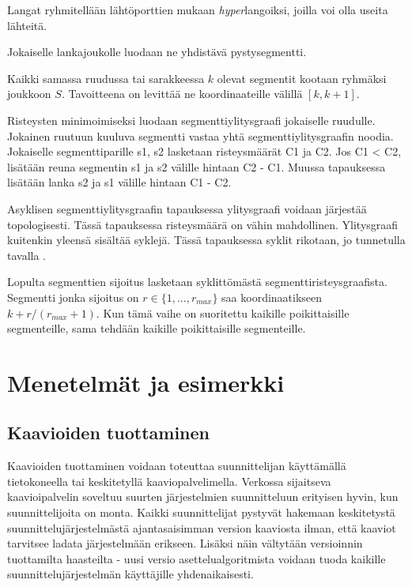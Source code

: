 \documentclass[finnish,12pt]{article}
\begin{document}
Langat ryhmitellään lähtöporttien mukaan \emph{hyper}langoiksi, joilla voi olla useita lähteitä.

Jokaiselle lankajoukolle luodaan ne yhdistävä pystysegmentti.

Kaikki samassa ruudussa tai sarakkeessa $k$ olevat segmentit kootaan ryhmäksi joukkoon $S$.
Tavoitteena on levittää ne koordinaateille välillä $[k, k+1]$.

Risteysten minimoimiseksi luodaan segmenttiylitysgraafi jokaiselle ruudulle.
Jokainen ruutuun kuuluva segmentti vastaa yhtä segmenttiylitysgraafin noodia.
Jokaiselle segmenttiparille s1, s2 lasketaan risteysmäärät C1 ja C2. Jos C1 < C2, lisätään reuna segmentin s1 ja s2 välille hintaan C2 - C1. Muussa tapauksessa lisätään lanka s2 ja s1 välille hintaan C1 - C2.

Asyklisen segmenttiylitysgraafin tapauksessa ylitysgraafi voidaan järjestää topologisesti.
Tässä tapauksessa risteysmäärä on vähin mahdollinen.
Ylitysgraafi kuitenkin yleensä sisältää syklejä. Tässä tapauksessa syklit rikotaan, jo tunnetulla tavalla \cite{RefWorks:48}.

Lopulta segmenttien sijoitus lasketaan syklittömästä segmenttiristeysgraafista.
Segmentti jonka sijoitus on $r \in \{1,...,r_{max}\}$ saa koordinaatikseen $k + r/(r_{max} +1)$.
Kun tämä vaihe on suoritettu kaikille poikittaisille segmenteille, sama tehdään kaikille poikittaisille segmenteille.

	\clearpage
	\section{Menetelmät ja esimerkki}

		\subsection{Kaavioiden tuottaminen}

Kaavioiden tuottaminen voidaan toteuttaa suunnittelijan käyttämällä tietokoneella tai keskitetyllä kaaviopalvelimella.
Verkossa sijaitseva kaavioipalvelin soveltuu suurten järjestelmien suunnitteluun erityisen hyvin, kun suunnittelijoita on monta.
Kaikki suunnittelijat pystyvät hakemaan keskitetystä suunnittelujärjestelmästä ajantasaisimman version kaaviosta ilman, että kaaviot tarvitsee ladata järjestelmään erikseen.
Lisäksi näin vältytään versioinnin tuottamilta haasteilta - uusi versio asettelualgoritmista voidaan tuoda kaikille suunnittelujärjestelmän käyttäjille yhdenaikaisesti.
\end{document}
